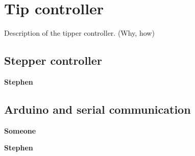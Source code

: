 \section{Tip controller} %
\label{sec:mr_tip_controller}

Description of the tipper controller. (Why, how)

\subsection{Stepper controller} %
\label{sub:stepper_controller}
\textbf{Stephen}

\subsection{Arduino and serial communication} %
\label{sub:arduino_and_serial_communication}
\textbf{Someone}

\textbf{Stephen}

